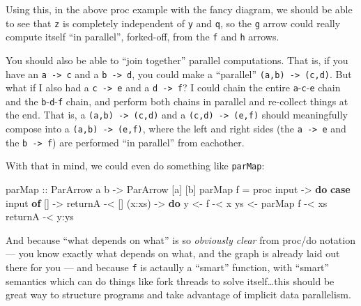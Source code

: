 \documentclass[]{article}
\newenvironment{Shaded}{}{}
\newcommand{\KeywordTok}[1]{\textcolor[rgb]{0.00,0.44,0.13}{\textbf{#1}}}
\newcommand{\DataTypeTok}[1]{\textcolor[rgb]{0.56,0.13,0.00}{#1}}
\newcommand{\OtherTok}[1]{\textcolor[rgb]{0.00,0.44,0.13}{#1}}
\newcommand{\FunctionTok}[1]{\textcolor[rgb]{0.02,0.16,0.49}{#1}}
\newcommand{\NormalTok}[1]{#1}
\begin{document}
Using this, in the above proc example with the fancy diagram, we should be able
to see that \texttt{z} is completely independent of \texttt{y} and \texttt{q},
so the \texttt{g} arrow could really compute itself ``in parallel'', forked-off,
from the \texttt{f} and \texttt{h} arrows.

You should also be able to ``join together'' parallel computations. That is, if
you have an \texttt{a\ -\textgreater{}\ c} and a \texttt{b\ -\textgreater{}\ d},
you could make a ``parallel'' \texttt{(a,b)\ -\textgreater{}\ (c,d)}. But what
if I also had a \texttt{c\ -\textgreater{}\ e} and a
\texttt{d\ -\textgreater{}\ f}? I could chain the entire
\texttt{a}-\texttt{c}-\texttt{e} chain and the \texttt{b}-\texttt{d}-\texttt{f}
chain, and perform both chains in parallel and re-collect things at the end.
That is, a \texttt{(a,b)\ -\textgreater{}\ (c,d)} and a
\texttt{(c,d)\ -\textgreater{}\ (e,f)} should meaningfully compose into a
\texttt{(a,b)\ -\textgreater{}\ (e,f)}, where the left and right sides (the
\texttt{a\ -\textgreater{}\ e} and the \texttt{b\ -\textgreater{}\ f}) are
performed ``in parallel'' from eachother.

With that in mind, we could even do something like \texttt{parMap}:

\begin{Shaded}
\begin{Highlighting}[]
\OtherTok{parMap ::} \DataTypeTok{ParArrow}\NormalTok{ a b }\OtherTok{->} \DataTypeTok{ParArrow}\NormalTok{ [a] [b]}
\NormalTok{parMap f }\FunctionTok{=}\NormalTok{ proc input }\OtherTok{->} \KeywordTok{do}
    \KeywordTok{case}\NormalTok{ input }\KeywordTok{of}
\NormalTok{      []     }\OtherTok{->}
\NormalTok{          returnA        }\FunctionTok{-<}\NormalTok{ []}
\NormalTok{      (x}\FunctionTok{:}\NormalTok{xs) }\OtherTok{->} \KeywordTok{do}
\NormalTok{          y  }\OtherTok{<-}\NormalTok{ f        }\FunctionTok{-<}\NormalTok{ x}
\NormalTok{          ys }\OtherTok{<-}\NormalTok{ parMap f }\FunctionTok{-<}\NormalTok{ xs}
\NormalTok{          returnA        }\FunctionTok{-<}\NormalTok{ y}\FunctionTok{:}\NormalTok{ys}
\end{Highlighting}
\end{Shaded}

And because ``what depends on what'' is so \emph{obviously clear} from proc/do
notation --- you know exactly what depends on what, and the graph is already
laid out there for you --- and because \texttt{f} is actaully a ``smart''
function, with ``smart'' semantics which can do things like fork threads to
solve itself\ldots{}this should be great way to structure programs and take
advantage of implicit data parallelism.
\end{document}
